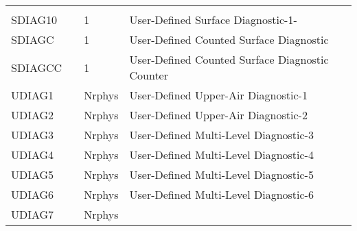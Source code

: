 \begin{table}
\begin{tabular}{llll}
\begin{minipage}[t]{3in}
         \end{minipage}\\
 SDIAG10  &             &    1  
         &\begin{minipage}[t]{3in}
          {User-Defined Surface Diagnostic-1-} 
         \end{minipage}\\
 SDIAGC   &             &    1  
         &\begin{minipage}[t]{3in}
          {User-Defined Counted Surface Diagnostic} 
         \end{minipage}\\
 SDIAGCC  &             &    1  
         &\begin{minipage}[t]{3in}
          {User-Defined Counted Surface Diagnostic Counter} 
         \end{minipage}\\
 UDIAG1   &             &    Nrphys
         &\begin{minipage}[t]{3in}
          {User-Defined Upper-Air Diagnostic-1} 
         \end{minipage}\\
 UDIAG2   &             &    Nrphys
         &\begin{minipage}[t]{3in}
          {User-Defined Upper-Air Diagnostic-2} 
         \end{minipage}\\
 UDIAG3   &             &    Nrphys  
         &\begin{minipage}[t]{3in}
          {User-Defined Multi-Level Diagnostic-3} 
         \end{minipage}\\
 UDIAG4   &             &    Nrphys  
         &\begin{minipage}[t]{3in}
          {User-Defined Multi-Level Diagnostic-4} 
         \end{minipage}\\
 UDIAG5   &             &    Nrphys  
         &\begin{minipage}[t]{3in}
          {User-Defined Multi-Level Diagnostic-5} 
         \end{minipage}\\
 UDIAG6   &             &    Nrphys  
         &\begin{minipage}[t]{3in}
          {User-Defined Multi-Level Diagnostic-6} 
         \end{minipage}\\
 UDIAG7   &             &    Nrphys  
         &\begin{minipage}[t]{3in}

\end{minipage}
\end{tabular}
\end{table}

